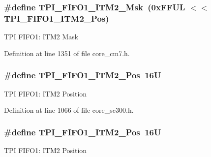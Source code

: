 \subsubsection[{\texorpdfstring{T\+P\+I\+\_\+\+F\+I\+F\+O1\+\_\+\+I\+T\+M2\+\_\+\+Msk}{TPI_FIFO1_ITM2_Msk}}]{\setlength{\rightskip}{0pt plus 5cm}\#define T\+P\+I\+\_\+\+F\+I\+F\+O1\+\_\+\+I\+T\+M2\+\_\+\+Msk~(0x\+F\+F\+U\+L $<$$<$ T\+P\+I\+\_\+\+F\+I\+F\+O1\+\_\+\+I\+T\+M2\+\_\+\+Pos)}\hypertarget{group___c_m_s_i_s___t_p_i_gae54512f926ebc00f2e056232aa21d335}{}\label{group___c_m_s_i_s___t_p_i_gae54512f926ebc00f2e056232aa21d335}
T\+PI F\+I\+F\+O1\+: I\+T\+M2 Mask 

Definition at line 1351 of file core\+\_\+cm7.\+h.

\subsubsection[{\texorpdfstring{T\+P\+I\+\_\+\+F\+I\+F\+O1\+\_\+\+I\+T\+M2\+\_\+\+Pos}{TPI_FIFO1_ITM2_Pos}}]{\setlength{\rightskip}{0pt plus 5cm}\#define T\+P\+I\+\_\+\+F\+I\+F\+O1\+\_\+\+I\+T\+M2\+\_\+\+Pos~16U}\hypertarget{group___c_m_s_i_s___t_p_i_ga1828c228f3940005f48fb8dd88ada35b}{}\label{group___c_m_s_i_s___t_p_i_ga1828c228f3940005f48fb8dd88ada35b}
T\+PI F\+I\+F\+O1\+: I\+T\+M2 Position 

Definition at line 1066 of file core\+\_\+sc300.\+h.

\subsubsection[{\texorpdfstring{T\+P\+I\+\_\+\+F\+I\+F\+O1\+\_\+\+I\+T\+M2\+\_\+\+Pos}{TPI_FIFO1_ITM2_Pos}}]{\setlength{\rightskip}{0pt plus 5cm}\#define T\+P\+I\+\_\+\+F\+I\+F\+O1\+\_\+\+I\+T\+M2\+\_\+\+Pos~16U}\hypertarget{group___c_m_s_i_s___t_p_i_ga1828c228f3940005f48fb8dd88ada35b}{}\label{group___c_m_s_i_s___t_p_i_ga1828c228f3940005f48fb8dd88ada35b}
T\+PI F\+I\+F\+O1\+: I\+T\+M2 Position 

